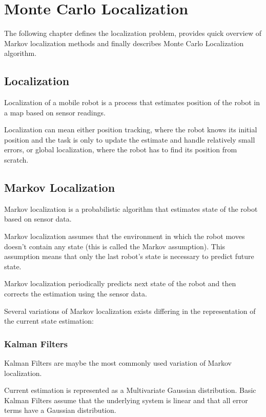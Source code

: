 \chapter{Monte Carlo Localization}
\label{chap:mcl}

The following chapter defines the localization problem, provides quick overview
of Markov localization methods and finally describes Monte Carlo Localization
algorithm.

\section{Localization}
Localization of a mobile robot is a process that estimates position of the robot
in a map based on sensor readings.

Localization can mean either position tracking, where the robot knows its initial
position and the task is only to update the estimate and handle relatively small
errors, or global localization, where the robot has to find its position from scratch.

\section{Markov Localization}

Markov localization is a probabilistic algorithm that estimates state of the
robot based on sensor data.

Markov localization assumes that the environment in which the robot moves
doesn't contain any state (this is called the Markov assumption).
This assumption means that only the last robot's state is necessary to predict
future state.

Markov localization periodically predicts next state of the robot and then
corrects the estimation using the sensor data.

Several variations of Markov localization exists differing in the
representation of the current state estimation:

\subsection{Kalman Filters}
\label{sec:kalman}

Kalman Filters \cite{kalman60,welch95} are maybe the most commonly used variation of Markov localization.

Current estimation is represented as a Multivariate Gaussian distribution.
Basic Kalman Filters assume that the underlying system is linear and that
all error terms have a Gaussian distribution.

